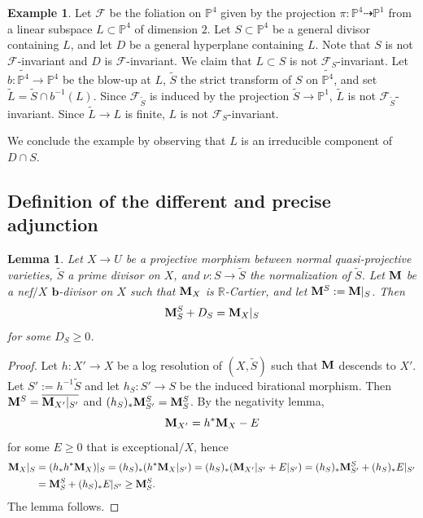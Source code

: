 \documentclass[11pt,reqno]{amsart}
\numberwithin{equation}{section}
\newcommand{\bb}{\bm{b}}
\newcommand{\Mm}{{\bf{M}}}
\newcommand{\Rr}{\mathbb{R}}
\newcommand{\Ff}{\mathcal{F}}
\newtheorem{lem}[thm]{Lemma}
\theoremstyle{definition}
\newtheorem{ex}[thm]{Example}
\begin{document}
\begin{ex}
Let $\Ff$ be the foliation on $\mathbb P^4$ given by the projection $\pi\colon \mathbb P^4 \dashrightarrow \mathbb P^1$ from a linear subspace $L\subset\mathbb P^4$ of dimension $2$. 
Let $S\subset\mathbb P^4$ be a general divisor containing $L$, and let $D$ be a general hyperplane containing $L$. Note that $S$ is not $\mathcal F$-invariant and $D$ is $\mathcal F$-invariant.
We claim that $L \subset S$ is not $\mathcal F_S$-invariant. Let $b\colon \widetilde{\mathbb P^4} \to \mathbb P^4$ be the blow-up at $L$, $\widetilde{S}$ the strict transform of $S$ on $\widetilde{\mathbb P^4}$, and set $\widetilde{L} = \widetilde{S} \cap b^{-1}(L)$.
Since $\mathcal F_{\widetilde{S}}$ is induced by the projection $\widetilde{S} \to \mathbb P^1$, $\widetilde{L}$ is not $\mathcal F_{\widetilde{S}}$-invariant. Since $\widetilde{L} \to L$ is finite, $L$ is not $\mathcal F_S$-invariant.

We conclude the example by observing that $L$ is an irreducible component of $D \cap S$.
\end{ex}


\subsection{Definition of the different and precise adjunction}

\begin{lem}\label{lem: bnef adjunction effectivity}
    Let $X\rightarrow U$ be a projective morphism between normal quasi-projective varieties, $\widetilde{S}$ a prime divisor on $X$, and $\nu: S\rightarrow\widetilde{S}$ the normalization of $\widetilde{S}$. Let $\Mm$ be a nef$/X$ $\bb$-divisor on $X$ such that $\Mm_X$ is $\Rr$-Cartier, and let $\Mm^S:=\Mm|_S$. Then
    $$\Mm^S_S+D_S=\Mm_X|_S$$
    for some $D_S\geq 0$.
\end{lem}
\begin{proof}
    Let $h\colon X'\rightarrow X$ be a log resolution of $(X,\widetilde S)$ such that $\Mm$ descends to $X'$. Let $S':=h^{-1}\widetilde{S}$ and let $h_S: S'\rightarrow S$ be the induced birational morphism. Then $\Mm^S=\overline{\Mm_{X'}|_{S'}}$ and $(h_S)_*\Mm^S_{S'}=\Mm^S_S$. By the negativity lemma,
    $$\Mm_{X'}=h^*\Mm_X-E$$
    for some $E\geq 0$ that is exceptional$/X$, hence
    \begin{align*}
    \Mm_X|_S&=(h_*h^*\Mm_X)|_S=(h_S)_*(h^*\Mm_X|_{S'})=(h_S)_*(\Mm_{X'}|_{S'}+E|_{S'})=(h_S)_*\Mm^S_{S'}+(h_S)_*E|_{S'}\\
    &=\Mm^S_S+(h_S)_*E|_{S'}\geq \Mm^S_S.
\end{align*}
The lemma follows.
\end{proof}
\end{document}
